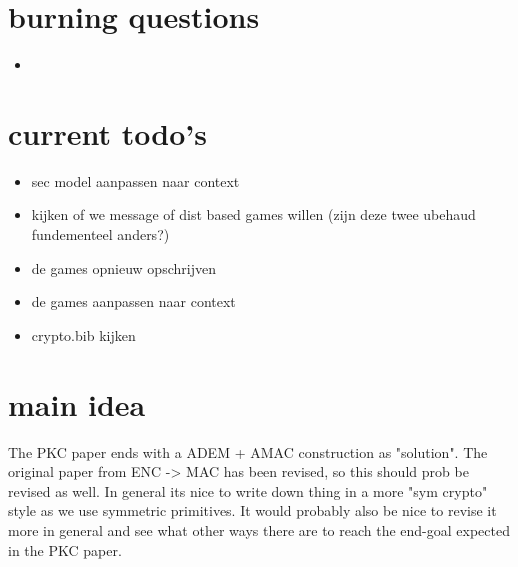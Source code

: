 \documentclass{article}
\begin{document}
\newpage
\section{burning questions}
\begin{itemize}
   \item 
   
\end{itemize}
\newpage
\section{current todo's}
\begin{itemize}
    \item sec model aanpassen naar context
    \item kijken of we message of dist based games willen (zijn deze twee ubehaud fundementeel anders?)
    \item de games opnieuw opschrijven
    \item de games aanpassen naar context
    \item crypto.bib kijken
\end{itemize}
\newpage
\section{main idea}
The PKC paper ends with a ADEM + AMAC construction as "solution". The original paper from ENC -> MAC has been revised, so this should prob be revised as well. In general its nice to write down thing in a more "sym crypto" style as we use symmetric primitives. It would probably also be nice to revise it more in general and see what other ways there are to reach the end-goal expected in the PKC paper.
\end{document}
